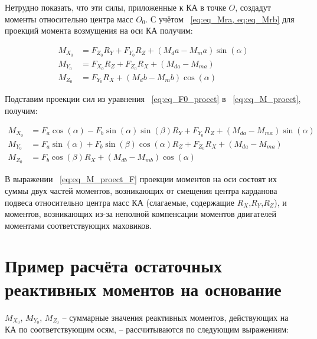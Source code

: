 Нетрудно показать, что эти силы, приложенные к КА в точке $O$, создадут моменты относительно центра масс $O_0$. С учётом ~\cref{eq:eq_Mra, eq:eq_Mrb} для проекций момента возмущения на оси КА получим:
\begin{samepage}
	\begin{equation}
		\label{eq:eq_M_proect}
		\begin{aligned}
			M_{X_0} &= F_{Z_0}R_Y+F_{Y_0}R_Z+(M_da-M_ma)\sin(\alpha) \\
			M_{Y_0} &= F_{X_0}R_Z+F_{Z_0}R_X+(M_{da}-M_{ma})\\
			M_{Z_0} &= F_{Y_0}R_X+(M_db-M_mb)\cos(\alpha)
		\end{aligned}	
	\end{equation}
\end{samepage}

Подставим проекции сил из уравнения ~\cref{eq:eq_F0_proect} в ~\cref{eq:eq_M_proect}, получим:
\begin{samepage}
	\begin{equation}
		\label{eq:eq_M_proect_F}
		\begin{aligned}
			M_{X_0} &= F_a\cos(\alpha)-F_b\sin(\alpha)\sin(\beta)R_Y+F_{Y_0}R_Z+(M_{da}-M_{ma})\sin(\alpha) \\
			M_{Y_0} &= F_a\sin(\alpha)+F_b\sin(\beta)\cos(\alpha)R_Z+F_{Z_0}R_X+(M_{da}-M_{ma})\\
			M_{Z_0} &= F_b\cos(\beta)R_X+(M_{db}-M_{mb})\cos(\alpha)
		\end{aligned}	
	\end{equation}
\end{samepage}

В выражении ~\cref{eq:eq_M_proect_F} проекции моментов на оси состоят их суммы двух частей моментов, возникающих от смещения центра карданова подвеса относительно центра масс КА (слагаемые, содержащие $R_X$,$R_Y$,$R_Z$), и моментов, возникающих из-за неполной компенсации моментов двигателей моментами соответствующих маховиков. 



\section{Пример расчёта остаточных реактивных моментов на основание}\label{sec:ch2/sec2}

$M_{X_0}$, $M_{Y_0}$, $M_{Z_0}$ – суммарные значения реактивных моментов, действующих на КА по соответствующим осям, – рассчитываются по следующим выражениям:


